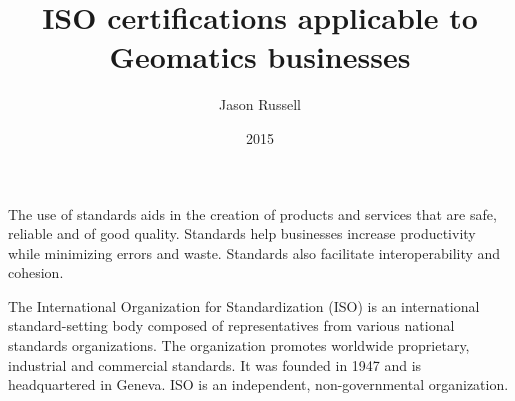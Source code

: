 \documentclass[11pt,a4paper]{article}
\title{ISO certifications applicable to Geomatics businesses}
\date{2015}
\author{Jason Russell}
\begin{document}
\maketitle

\newpage

The use of standards aids in the creation of products and services that are safe, reliable and of good quality. Standards help businesses increase productivity while minimizing errors and waste. Standards also facilitate interoperability and cohesion.



The International Organization for Standardization (ISO) is an international standard-setting body composed of representatives from various national standards organizations. The organization promotes worldwide proprietary, industrial and commercial standards. It was founded in 1947 and is headquartered in Geneva. ISO is an independent, non-governmental organization.


\newpage
\printbibliography
\end{document}
